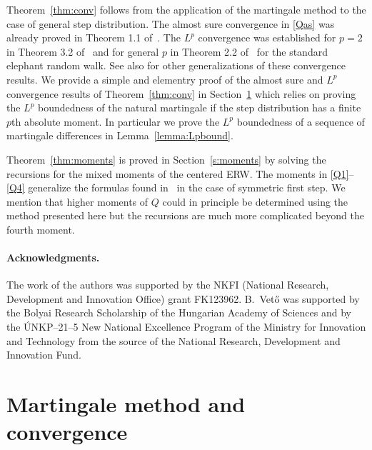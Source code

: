 \documentclass[12pt,a4paper]{article}
\numberwithin{equation}{section}
\begin{document}
Theorem~\ref{thm:conv} follows from the application of the martingale method to the case of general step distribution.
The almost sure convergence in \eqref{Qas} was already proved in Theorem 1.1 of~\cite{Bertenghi21}.
The $L^p$ convergence was established for $p=2$ in Theorem 3.2 of~\cite{Bertoin21b}
and for general $p$ in Theorem 2.2 of~\cite{BCR19} for the standard elephant random walk.
See also \cite{Bertoin21a} for other generalizations of these convergence results.
We provide a simple and elementry proof of the almost sure and $L^p$ convergence results of Theorem~\ref{thm:conv} in Section~\ref{s:conv}
which relies on proving the $L^p$ boundedness of the natural martingale if the step distribution has a finite $p$th absolute moment.
In particular we prove the $L^p$ boundedness of a sequence of martingale differences in Lemma~\ref{lemma:Lpbound}.

Theorem~\ref{thm:moments} is proved in Section~\ref{s:moments} by solving the recursions for the mixed moments of the centered ERW.
The moments in \eqref{Q1}--\eqref{Q4} generalize the formulas found in~\cite{Bercu17} in the case of symmetric first step.
We mention that higher moments of $Q$ could in principle be determined using the method presented here but the recursions are much more complicated
beyond the fourth moment.

\paragraph{Acknowledgments.}
The work of the authors was supported by the NKFI (National Research, Development and Innovation Office) grant FK123962.
B.\ Vet\H o was supported by the Bolyai Research Scholarship of the Hungarian Academy of Sciences
and by the \'UNKP--21--5 New National Excellence Program of the Ministry for Innovation and Technology
from the source of the National Research, Development and Innovation Fund.

\section{Martingale method and convergence}
\label{s:conv}
\end{document}
